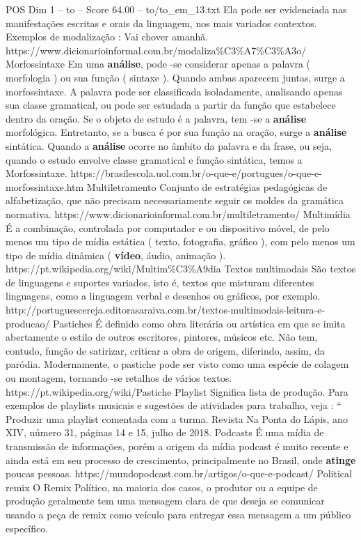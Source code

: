 \begin{textsample}{POS Dim 1 – to – Score 64.00 – to/to\_em\_13.txt}
Ela pode ser evidenciada nas manifestações escritas e orais da linguagem, nos mais variados contextos.
Exemplos de modalização : Vai chover amanhã. https://www.dicionarioinformal.com.br/modaliza\%C3\%A7\%C3\%A3o/ Morfossintaxe Em uma \textbf{análise}, pode -se considerar apenas a palavra ( morfologia ) ou sua função ( sintaxe ).
Quando ambas aparecem juntas, surge a morfossintaxe.
A palavra pode ser classificada isoladamente, analisando apenas sua classe gramatical, ou pode ser estudada a partir da função que estabelece dentro da oração.
Se o objeto de estudo é a palavra, tem -se a \textbf{análise} morfológica.
Entretanto, se a busca é por sua função na oração, surge a \textbf{análise} sintática.
Quando a \textbf{análise} ocorre no âmbito da palavra e da frase, ou seja, quando o estudo envolve classe gramatical e função sintática, temos a Morfossintaxe. https://brasilescola.uol.com.br/o-que-e/portugues/o-que-e-morfossintaxe.htm Multiletramento Conjunto de estratégias pedagógicas de alfabetização, que não precisam necessariamente seguir os moldes da gramática normativa. https://www.dicionarioinformal.com.br/multiletramento/ Multimídia É a combinação, controlada por computador e ou dispositivo móvel, de pelo menos um tipo de mídia estática ( texto, fotografia, gráfico ), com pelo menos um tipo de mídia dinâmica ( \textbf{vídeo}, áudio, animação ). https://pt.wikipedia.org/wiki/Multim\%C3\%A9dia Textos multimodais São textos de linguagens e suportes variados, isto é, textos que misturam diferentes linguagens, como a linguagem verbal e desenhos ou gráficos, por exemplo. http://portuguescereja.editorasaraiva.com.br/textos-multimodais-leitura-e-producao/ Pastiches É definido como obra literária ou artística em que se imita abertamente o estilo de outros escritores, pintores, músicos etc.
Não tem, contudo, função de satirizar, criticar a obra de origem, diferindo, assim, da paródia.
Modernamente, o pastiche pode ser visto como uma espécie de colagem ou montagem, tornando -se retalhos de vários textos. https://pt.wikipedia.org/wiki/Pastiche Playlist Significa lista de produção.
Para exemplos de playlists musicais e sugestões de atividades para trabalho, veja : “ Produzir uma playlist comentada com a turma.
Revista Na Ponta do Lápis, ano XIV, número 31, páginas 14 e 15, julho de 2018.
Podcasts É uma mídia de transmissão de informações, porém a origem da mídia podcast é muito recente e ainda está em seu processo de crescimento, principalmente no Brasil, onde \textbf{atinge} poucas pessoas. https://mundopodcast.com.br/artigos/o-que-e-podcast/ Political remix O Remix Político, na maioria dos casos, o produtor ou a equipe de produção geralmente tem uma mensagem clara de que deseja se comunicar usando a peça de remix como veículo para entregar essa mensagem a um público específico.

\end{textsample}
